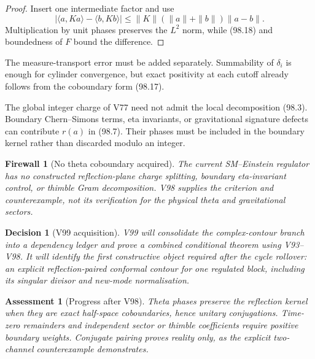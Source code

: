 \documentclass[11pt]{article}
\newtheorem{assessment}[theorem]{Assessment}
\newtheorem{firewall}[theorem]{Firewall}
\newtheorem{decision}[theorem]{Decision}
\begin{document}
\begin{proof}
Insert one intermediate factor and use
\[
 |\langle a,Ka\rangle-\langle b,Kb\rangle|
 \le\|K\|(\|a\|+\|b\|)\|a-b\|.
\]
Multiplication by unit phases preserves the \(L^2\) norm, while
(98.18) and boundedness of \(F\) bound the difference.
\end{proof}

The measure-transport error must be added separately.  Summability of
\(\delta_i\) is enough for cylinder convergence, but exact positivity
at each cutoff already follows from the coboundary form (98.17).

\begin{warning}
\label{warn:v11v98-splitting}
The global integer charge of V77 need not admit the local
decomposition (98.3).  Boundary Chern--Simons terms, eta invariants,
or gravitational signature defects can contribute \(r(a)\) in
(98.7).  Their phases must be included in the boundary kernel rather
than discarded modulo an integer.
\end{warning}

\begin{firewall}[No theta coboundary acquired]
\label{fire:v11v98-boundary}
The current SM--Einstein regulator has no constructed reflection-plane
charge splitting, boundary eta-invariant control, or thimble Gram
decomposition.  V98 supplies the criterion and counterexample, not
its verification for the physical theta and gravitational sectors.
\end{firewall}

\begin{decision}[V99 acquisition]
\label{dec:v11v98-next}
V99 will consolidate the complex-contour branch into a dependency
ledger and prove a combined conditional theorem using V93--V98.
It will identify the first constructive object required after the
cycle rollover: an explicit reflection-paired conformal contour for
one regulated block, including its singular divisor and new-mode
normalisation.
\end{decision}

\begin{assessment}[Progress after V98]
\label{ass:v11v98-status}
Theta phases preserve the reflection kernel when they are exact
half-space coboundaries, hence unitary conjugations.  Time-zero
remainders and independent sector or thimble coefficients require
positive boundary weights.  Conjugate pairing proves reality only,
as the explicit two-channel counterexample demonstrates.
\end{assessment}
\end{document}
